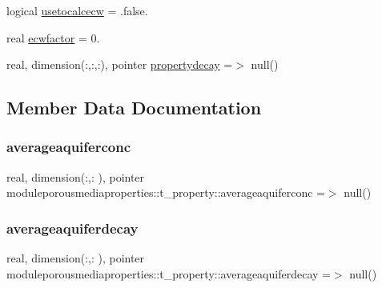 \begin{DoxyCompactItemize}
\item 
logical \mbox{\hyperlink{structmoduleporousmediaproperties_1_1t__property_a098e7baee66e21aec4624dea02447076}{usetocalcecw}} = .false.
\item 
real \mbox{\hyperlink{structmoduleporousmediaproperties_1_1t__property_a15c1ff5553269d555e03fbfa187b6295}{ecwfactor}} = 0.
\item 
real, dimension(\+:,\+:,\+:), pointer \mbox{\hyperlink{structmoduleporousmediaproperties_1_1t__property_aa6920bbd5377cf7499b54e132bf9ccae}{propertydecay}} =$>$ null()
\end{DoxyCompactItemize}


\subsection{Member Data Documentation}
\mbox{\label{structmoduleporousmediaproperties_1_1t__property_aed01ce2ed0739958be83d9d1086b9180}} 
\subsubsection{\texorpdfstring{averageaquiferconc}{averageaquiferconc}}
{\footnotesize\ttfamily real, dimension(\+:,\+:  ), pointer moduleporousmediaproperties\+::t\+\_\+property\+::averageaquiferconc =$>$ null()\hspace{0.3cm}{\ttfamily [private]}}

\mbox{\label{structmoduleporousmediaproperties_1_1t__property_a5f990bea8f0a6e22bfc75e5c68f5da29}} 
\subsubsection{\texorpdfstring{averageaquiferdecay}{averageaquiferdecay}}
{\footnotesize\ttfamily real, dimension(\+:,\+:  ), pointer moduleporousmediaproperties\+::t\+\_\+property\+::averageaquiferdecay =$>$ null()\hspace{0.3cm}{\ttfamily [private]}}

